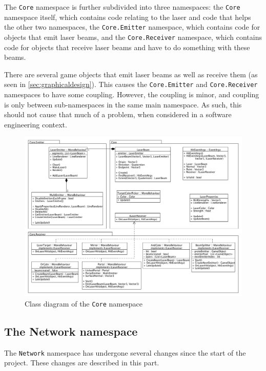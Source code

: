 			The \texttt{Core} namespace is further subdivided into three namespaces:
			the \texttt{Core} namespace itself, which contains code relating to the laser
			and code that helps the other two namespaces, the 
			\texttt{Core.Emitter} namespace, which contains code for objects 
			that emit laser beams, and the \texttt{Core.Receiver} namespace, 
			which contains code for objects that receive laser beams and have to 
			do something with these beams.
			
			There are several game objects that emit laser beams as well as 
			receive them (as seen in \ref{sec:graphicaldesign}). This causes the
			\texttt{Core.Emitter} and \texttt{Core.Receiver} namespaces to have 
			some coupling. However, the coupling is minor, and coupling is only 
			between sub-namespaces in the same main namespace. As such, this 
			should not cause that much of a problem, when considered in a 
			software engineering context.
			
			\begin{figure}[ht]
				\includegraphics[width=\textwidth]{ClassDiagramCore}
				\caption{Class diagram of the \texttt{Core} namespace}
				\label{fig:classdiagramcore}
			\end{figure}
			
		\subsection{The Network namespace} \label{ssec:networknamespace}
			The \texttt{Network} namespace has undergone several changes since the start
			of the project. These changes are described in this part.
			

